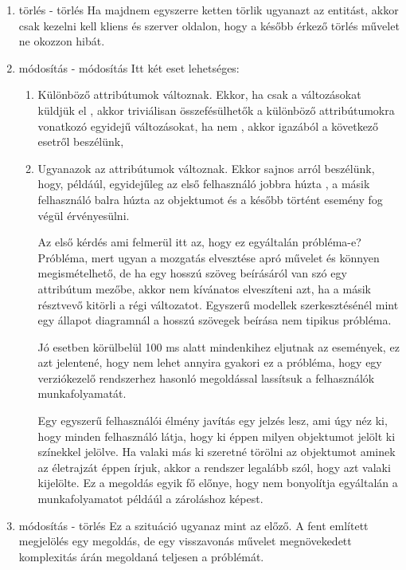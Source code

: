 \begin{enumerate}
\item { törlés - törlés} Ha majdnem egyszerre ketten törlik ugyanazt az entitást, akkor csak kezelni kell kliens és szerver oldalon, hogy a később érkező törlés művelet ne okozzon hibát. 
\item { módosítás - módosítás} Itt két eset lehetséges:
\begin{enumerate}
\item Különböző attribútumok változnak. Ekkor, ha csak a változásokat küldjük el , akkor triviálisan összefésülhetők a különböző attribútumokra vonatkozó egyidejű változásokat, ha nem , akkor igazából a következő esetről beszélünk,
\item Ugyanazok az attribútumok változnak. Ekkor sajnos arról beszélünk, hogy, példáúl, egyidejűleg az első felhasználó jobbra 
húzta , a másik felhasználó balra húzta az objektumot és a később történt esemény fog végül érvényesülni. 

Az első kérdés ami felmerül itt az, hogy ez egyáltalán próbléma-e? Próbléma, mert ugyan a mozgatás elvesztése apró művelet és könnyen megismételhető, de ha egy hosszú szöveg beírásáról van szó egy attribútum mezőbe, akkor nem kívánatos elveszíteni azt, ha a másik résztvevő kitörli a régi változatot. Egyszerű modellek szerkesztésénél mint egy állapot diagramnál a hosszú szövegek beírása nem tipikus próbléma. 

Jó esetben körülbelül 100 ms alatt mindenkihez eljutnak az események, ez azt jelentené, hogy nem lehet annyira gyakori ez a próbléma, hogy egy verziókezelő rendszerhez hasonló megoldással lassítsuk a felhasználók munkafolyamatát.



Egy egyszerű felhasználói élmény javítás egy jelzés lesz, ami úgy néz ki, hogy minden felhasználó látja, hogy ki éppen milyen objektumot jelölt ki színekkel jelölve. Ha valaki más ki szeretné törölni az objektumot aminek az életrajzát éppen írjuk, akkor a rendszer legalább szól, hogy azt valaki kijelölte. Ez a megoldás egyik fő előnye, hogy nem bonyolítja egyáltalán a munkafolyamatot példáúl a zároláshoz képest.

\end{enumerate}
\item { módosítás - törlés } Ez a szituáció ugyanaz mint az előző. A fent említett megjelölés egy megoldás, de egy visszavonás művelet megnövekedett komplexitás árán megoldaná teljesen a próblémát.
\end{enumerate}

